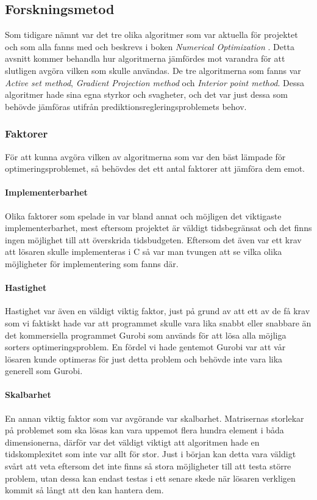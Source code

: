 \subsection{Forskningsmetod}
Som tidigare nämnt var det tre olika algoritmer som var aktuella för projektet och som alla fanns med och beskrevs i boken \emph{Numerical Optimization} \citep{numericaloptimization}. Detta avsnitt kommer behandla hur algoritmerna jämfördes mot varandra för att slutligen avgöra vilken som skulle användas.
\newline
\newline
De tre algoritmerna som fanns var \emph{Active set method}, \emph{Gradient Projection method} och \emph{Interior point method}. Dessa algoritmer hade sina egna styrkor och svagheter, och det var just dessa som behövde jämföras utifrån prediktionsregleringsproblemets behov.

\subsubsection{Faktorer}
För att kunna avgöra vilken av algoritmerna som var den bäst lämpade för optimeringsproblemet, så behövdes det ett antal faktorer att jämföra dem emot.

\paragraph{Implementerbarhet}
Olika faktorer som spelade in var bland annat och möjligen det viktigaste implementerbarhet, mest eftersom projektet är väldigt tidsbegränsat och det finns ingen möjlighet till att överskrida tidsbudgeten. Eftersom det även var ett krav att lösaren skulle implementeras i C så var man tvungen att se vilka olika möjligheter för implementering som fanns där.

\paragraph{Hastighet}
Hastighet var även en väldigt viktig faktor, just på grund av att ett av de få krav som vi faktiskt hade var att programmet skulle vara lika snabbt eller snabbare än det kommersiella programmet Gurobi som används för att lösa alla möjliga sorters optimeringsproblem. En fördel vi hade gentemot Gurobi var att vår lösaren kunde optimeras för just detta problem och behövde inte vara lika generell som Gurobi.

\paragraph{Skalbarhet}
En annan viktig faktor som var avgörande var skalbarhet. Matrisernas storlekar på problemet som ska lösas kan vara uppemot flera hundra element i båda dimensionerna, därför var det väldigt viktigt att algoritmen hade en tidskomplexitet som inte var allt för stor. Just i början kan detta vara väldigt svårt att veta eftersom det inte finns så stora möjligheter till att testa större problem, utan dessa kan endast testas i ett senare skede när lösaren verkligen kommit så långt att den kan hantera dem.

